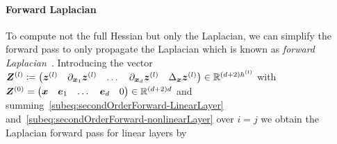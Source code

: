 \paragraph{Forward Laplacian}
To compute not the full Hessian but only the Laplacian, we can simplify the forward pass to only propagate the Laplacian which is known as \emph{forward Laplacian}~\citep{li2023forward}. Introducing the vector ${\bm{Z}}^{(l)}\coloneqq  \begin{pmatrix}
    {\bm{z}}^{(l)}
    &
    \partial_{{\bm{x}}_1} {\bm{z}}^{(l)}
    &
    \dots
    &
    \partial_{{\bm{x}}_d} {\bm{z}}^{(l)}
    &
    \Delta_{\bm{x}}{\bm{z}}^{(l)}
\end{pmatrix}\in \mathbb R^{(d+2)h^{(l)}}$ with ${\bm{Z}}^{(0)}=  \begin{pmatrix}
    {\bm{x}}
    &
    {\bm{e}}_1
    &
    \dots
    &
    {\bm{e}}_d
    &
    0
\end{pmatrix}\in \mathbb R^{(d+2)d}$ and summing~\eqref{subeq:secondOrderForward-LinearLayer} and~\eqref{subeq:secondOrderForward-nonlinearLayer} over $i=j$ we obtain the Laplacian forward pass for linear layers by

